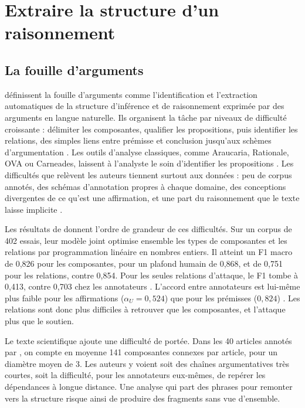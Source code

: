 \section{Extraire la structure d’un raisonnement}
\label{sec:extraction}

\subsection{La fouille d’arguments}

\textcite[765]{ref05} définissent la fouille d’arguments comme l’identification et l’extraction automatiques de la structure d’inférence et de raisonnement exprimée par des arguments en langue naturelle. Ils organisent la tâche par niveaux de difficulté croissante : délimiter les composantes, qualifier les propositions, puis identifier les relations, des simples liens entre prémisse et conclusion jusqu’aux schèmes d’argumentation \parencite[786--787]{ref05}. Les outils d’analyse classiques, comme Araucaria, Rationale, OVA ou Carneades, laissent à l’analyste le soin d’identifier les propositions \parencite[775]{ref05}. Les difficultés que relèvent les auteurs tiennent surtout aux données : peu de corpus annotés, des schémas d’annotation propres à chaque domaine, des conceptions divergentes de ce qu’est une affirmation, et une part du raisonnement que le texte laisse implicite \parencite[806--807]{ref05}.

Les résultats de \textcite{ref07} donnent l’ordre de grandeur de ces difficultés. Sur un corpus de 402 essais, leur modèle joint optimise ensemble les types de composantes et les relations par programmation linéaire en nombres entiers. Il atteint un F1 macro de 0,826 pour les composantes, pour un plafond humain de 0,868, et de 0,751 pour les relations, contre 0,854. Pour les seules relations d’attaque, le F1 tombe à 0,413, contre 0,703 chez les annotateurs \parencite[646]{ref07}. L’accord entre annotateurs est lui-même plus faible pour les affirmations ($\alpha_U = 0{,}524$) que pour les prémisses ($0{,}824$) \parencite[631]{ref07}. Les relations sont donc plus difficiles à retrouver que les composantes, et l’attaque plus que le soutien.

Le texte scientifique ajoute une difficulté de portée. Dans les 40 articles annotés par \textcite[43]{ref08}, on compte en moyenne 141 composantes connexes par article, pour un diamètre moyen de 3. Les auteurs y voient soit des chaînes argumentatives très courtes, soit la difficulté, pour les annotateurs eux-mêmes, de repérer les dépendances à longue distance. Une analyse qui part des phrases pour remonter vers la structure risque ainsi de produire des fragments sans vue d’ensemble.

